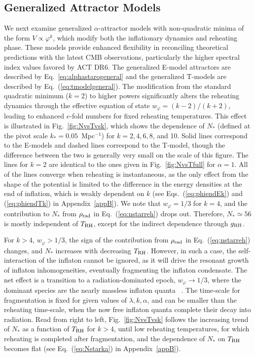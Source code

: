 \documentclass[aps,prev,twocolumn,preprintnumbers,floatfix,nofootinbib]{revtex4-1}
\newcommand{\trh}{T_{\rm RH}}
\begin{document}
\subsection{Generalized Attractor Models}\label{sec:phik}
We next examine generalized $\alpha$-attractor models with non-quadratic minima of the form $V \propto \varphi^k$, which modify both the inflationary dynamics and reheating phase. These models provide enhanced flexibility in reconciling theoretical predictions with the latest CMB observations, particularly the higher spectral index values favored by ACT DR6. The generalized E-model attractors are described by Eq.~\eqref{eq:alphastarogeneral} and the generalized T-models are described by Eq.~(\ref{eq:tmodelgeneral}).  The modification from the standard quadratic minimum ($k = 2$) to higher powers significantly alters the reheating dynamics through the effective equation of state $w_\varphi = (k-2)/(k+2)$, leading to enhanced $e$-fold numbers for fixed reheating temperatures. This effect is illustrated in Fig.~\ref{fig:NvsTvsk}, which shows the dependence of $N_*$ (defined at the pivot scale $k_* = 0.05$~Mpc$^{-1}$) for $k= 2, 4, 6, 8$, and 10. Solid lines correspond to the E-models and dashed lines correspond to the T-model, though the difference between the two is generally very small on the scale of this figure.  The lines for $k=2$ are identical to the ones given in Fig.~\ref{fig:NvsTfull} for $\alpha = 1$.
All of the lines converge when reheating is instantaneous, as the only effect from the shape of the potential is limited to the difference in the energy densities at the end of inflation, which is weakly dependent on $k$ (see Eqs.~(\ref{eq:phiendEk}) and (\ref{eq:phiendTk}) in Appendix~\ref{appB}). We note that $w_{\varphi}=1/3$ for $k=4$, and the contribution to $N_*$ from $\rho_{\rm rad}$ in Eq.~(\ref{eq:nstarreh}) drops out. Therefore, $N_* \simeq 56$ is mostly independent of $\trh$, except for the indirect dependence through $g_{\rm RH}$. 

For $k>4$, $w_{\varphi} > 1/3$, the sign of the contribution from $\rho_{\rm rad}$ in Eq.~(\ref{eq:nstarreh}) changes, and $N_*$ increases with decreasing $\trh$. However, in such a case, the self-interaction of the inflaton cannot be ignored, as it will drive the resonant growth of inflaton inhomogeneities, eventually fragmenting the inflaton condensate. The net effect is a transition to a radiation-dominated epoch, $w_{\varphi}\rightarrow 1/3$, where the dominant species are the nearly massless inflaton quanta~
\cite{Lozanov:2016hid,Lozanov:2017hjm,Garcia:2023eol,Garcia:2023dyf,Garcia:2024zir}. The time-scale for fragmentation is fixed for given values of $\lambda,k,\alpha$, and can be smaller than the reheating time-scale, when the now free inflaton quanta complete their decay into radiation. Read from right to left, Fig.~\ref{fig:NvsTvsk} follows the increasing trend of $N_*$ as a function of $\trh$ for $k>4$, until low reheating temperatures, for which reheating is completed after fragmentation, and the dependence of $N_*$ on $\trh$ becomes flat (see Eq.~(\ref{eq:Nstarka}) in Appendix~\ref{appB}).
\end{document}

